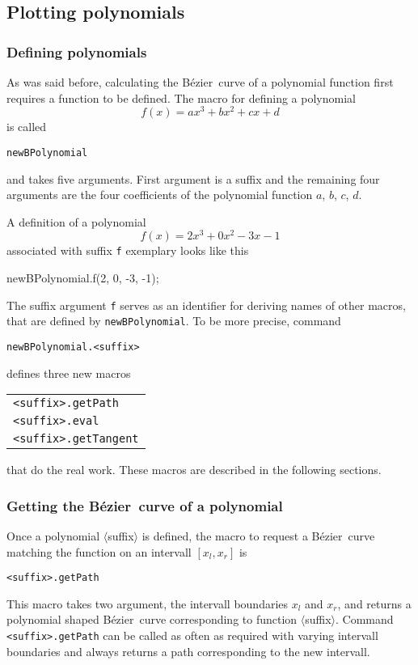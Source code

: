 \documentclass{article}
\newcommand*{\cmd}[1]{\texttt{#1}}
\newcommand*{\B}{B\'ezier}
\begin{document}
\subsection{Plotting polynomials}\label{sec:polynomials}
\subsubsection{Defining polynomials}\label{sec:newBPolynomial}
As was said before, calculating the \B\ curve of a polynomial function first requires a function to be defined.  The macro for defining a polynomial
\begin{equation}
  f(x) = ax^3 + bx^2 + cx + d
\end{equation}
is called
\begin{center}
  \cmd{newBPolynomial}
\end{center}
and takes five arguments.  First argument is a suffix and the remaining four arguments are the four coefficients of the polynomial function $a$, $b$, $c$, $d$.

A definition of a polynomial
\begin{equation}
  f(x) = 2x^3 + 0x^2 - 3x - 1  
\end{equation}
associated with suffix \cmd{f} exemplary looks like this
\begin{listing}
newBPolynomial.f(2, 0, -3, -1);
\end{listing}

The suffix argument \cmd{f} serves as an identifier for deriving names of other macros, that are defined by \cmd{newBPolynomial}.  To be more precise, command
\begin{center}
  \cmd{newBPolynomial.<suffix>}
\end{center}
defines three new macros
\begin{center}
  \begin{tabular}{l}
    \cmd{<suffix>.getPath} \\
    \cmd{<suffix>.eval} \\
    \cmd{<suffix>.getTangent} \\
  \end{tabular}
\end{center}
that do the real work.  These macros are described in the following sections.

\subsubsection{Getting the \B\ curve of a polynomial}\label{sec:getPath}
Once a polynomial $\langle$suffix$\rangle$ is defined, the macro to request a \B\ curve matching the function on an intervall $[x_l, x_r]$ is
\begin{center}
  \cmd{<suffix>.getPath}
\end{center}
This macro takes two argument, the intervall boundaries $x_l$ and $x_r$, and returns a polynomial shaped \B\ curve corresponding to function $\langle$suffix$\rangle$.  Command \cmd{<suffix>.getPath} can be called as often as required with varying intervall boundaries and always returns a path corresponding to the new intervall.
\end{document}
